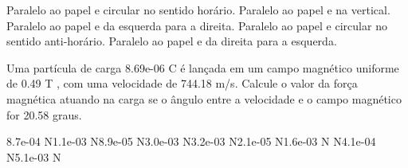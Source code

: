 \documentclass[12pt, addpoints]{exam}
\begin{document}
\begin{questions}
\begin{multicols*}{2}
\begin{choices}
\choice Paralelo ao papel e circular no sentido horário. 
\choice Paralelo ao papel e na vertical. 
\choice Paralelo ao papel e da esquerda para a direita. 
\choice Paralelo ao papel e circular no sentido anti-horário. 
\choice Paralelo ao papel e da direita para a esquerda. 
\end{choices}
\question Uma partícula de carga 8.69e-06 C é lançada em um campo magnético uniforme de    0.49 T , com uma velocidade de 744.18 m/s. Calcule o valor da força magnética atuando na carga se o ângulo entre a velocidade e o campo magnético for   20.58 graus.

\begin{oneparchoices}
\choice 8.7e-04 N\choice 1.1e-03 N\choice 8.9e-05 N\choice 3.0e-03 N\choice 3.2e-03 N\choice 2.1e-05 N\choice 1.6e-03 N N\choice 4.1e-04 N\choice 5.1e-03 N
\end{oneparchoices}\end{multicols*}
\end{questions}
\newpage
\end{document}
